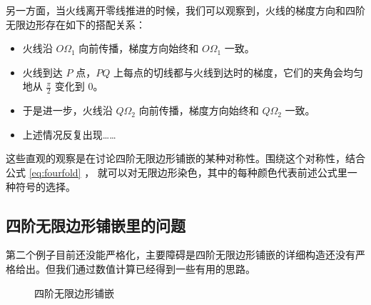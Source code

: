 \documentclass[a4paper,12pt]{article}
\numberwithin{problem}{section}
\numberwithin{definition}{section}
\numberwithin{lemma}{section}
\numberwithin{proposition}{section}
\numberwithin{theorem}{section}
\numberwithin{grammar}{section}
\numberwithin{program}{section}
\numberwithin{convention}{section}
\numberwithin{corollary}{section}
\begin{document}
另一方面，当火线离开零线推进的时候，我们可以观察到，火线的梯度方向和四阶无限边形存在如下的搭配关系：

\begin{itemize}
    \item 火线沿 $O\Omega_{1}$ 向前传播，梯度方向始终和 $O\Omega_{1}$ 一致。
    \item 火线到达 $P$ 点，$PQ$ 上每点的切线都与火线到达时的梯度，它们的夹角会均匀地从 $\frac{\pi}{2}$ 变化到 $0$。
    \item 于是进一步，火线沿 $Q\Omega_{2}$ 向前传播，梯度方向始终和 $Q\Omega_{2}$ 一致。
    \item 上述情况反复出现……
\end{itemize}

这些直观的观察是在讨论四阶无限边形铺嵌的某种对称性。围绕这个对称性，结合公式 \ref{eq:fourfold} ，
就可以对无限边形染色，其中的每种颜色代表前述公式里一种符号的选择。

\subsection{四阶无限边形铺嵌里的问题}

第二个例子目前还没能严格化，主要障碍是四阶无限边形铺嵌的详细构造还没有严格给出。但我们通过数值计算已经得到一些有用的思路。

\begin{figure}[ht]
    \centering
    \caption{四阶无限边形铺嵌}\label{fig:apeirogon}
\end{figure}
\end{document}
